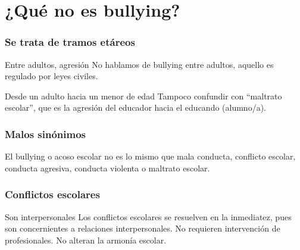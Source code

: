 \documentclass[12pt,spanish,x11names,svgnames]{beamer}
\title{\talktitle}
\subtitle{\talksubtitle}
\author{\talkauthor}
\institute{\talkaffiliation}
\date{\footnotesize{\emph{\href{\talkblog}{\talkemail}}}}
\begin{document}
\begin{frame}
\titlepage
\end{frame}
\section{¿Qué no es bullying?}
\begin{frame}[c]\frametitle{Se trata de tramos etáreos}
  \begin{alertblock}{Entre adultos, agresión}
    \pause No hablamos de bullying entre adultos, aquello es regulado por leyes civiles.
  \end{alertblock}
\pause
  \begin{alertblock}{Desde un adulto hacia un menor de edad}
    \pause Tampoco confundir con ``maltrato escolar'', que es la agresión del educador
    hacia el educando (alumno/a).
  \end{alertblock}
\end{frame}
\begin{frame}
  \frametitle{Malos sinónimos}
  \begin{alertblock}{}
    El bullying o acoso escolar no es lo mismo que mala conducta, conflicto escolar, conducta agresiva, conducta violenta o maltrato escolar. 
  \end{alertblock}
\end{frame}
\begin{frame}
  \frametitle{Conflictos escolares}
  \begin{exampleblock}{Son interpersonales}
    Los conflictos escolares se resuelven en la inmediatez, pues son concernientes a relaciones interpersonales. No requieren intervención de profesionales. No alteran la armonía escolar.
  \end{exampleblock}
\end{frame}
\end{document}
